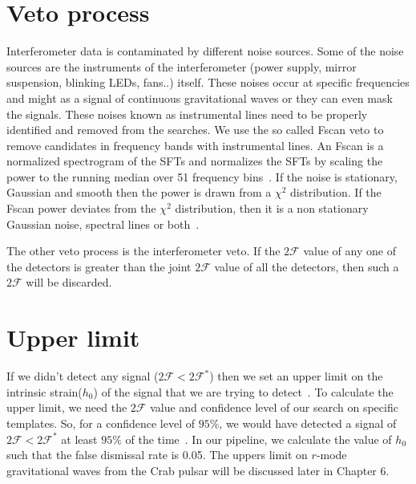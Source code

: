 \documentclass{ttuthes2007}
\begin{document}
\section{Veto process}
Interferometer data is contaminated by different noise sources. Some of
the noise sources are the instruments of the interferometer (power supply, mirror
suspension, blinking LEDs, fans..) itself. These noises occur at specific
frequencies and might    as a signal of continuous gravitational waves or
they can even mask the signals. These noises known as instrumental lines need
to be properly identified and removed from the searches. We use the so called
Fscan veto to remove candidates in frequency bands with instrumental lines. An Fscan is a
normalized spectrogram of the SFTs and normalizes the SFTs by scaling the
power to the running median over 51 frequency bins~\cite{Aasi_2015}. If the
noise is stationary, Gaussian and smooth then the power is drawn from a $\chi^2$
distribution. If the Fscan power deviates from the $\chi^2$ distribution, then
it is a non stationary Gaussian noise, spectral lines or both~\cite{Aasi_2015}.

The other veto process is the interferometer veto. If the $2\mathcal{F}$ value
of any one of the detectors is greater than the joint $2\mathcal{F}$ value of all
the detectors, then such a $2\mathcal{F}$ will be discarded. 

\section{Upper limit}
If we didn't detect any signal ($2\mathcal{F}<2\mathcal{F}^*$) then we set an
upper limit on the intrinsic strain($h_0$) of the signal that we are trying to
detect~\cite{Romano_2017}. To calculate the upper limit, we need the
$2\mathcal{F}$ value and confidence level of our search on specific templates. 
So, for a confidence level of $95\%$, we would have detected a signal of
$2\mathcal{F}<2\mathcal{F}^*$ at least $95\%$ of the time~\cite{Romano_2017}. In
our pipeline, we calculate the value of $h_0$ such that the false dismissal rate
is 0.05.
The uppers limit on $r$-mode gravitational waves from the Crab pulsar will be
discussed later in Chapter 6.
\end{document}
